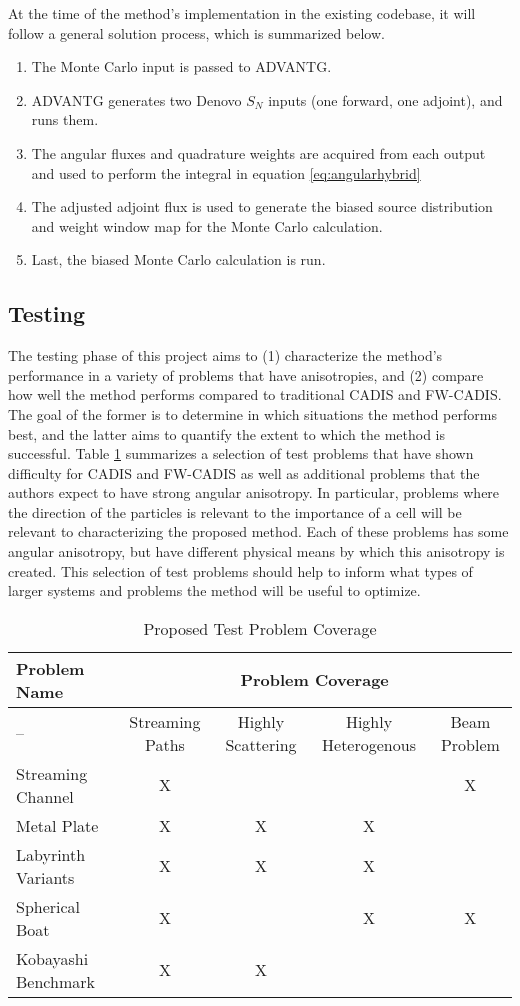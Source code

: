 \documentclass{mc2015}
\begin{document}
At the time of the method's implementation in the existing codebase, it will follow a general solution process, which is summarized below. 
\begin{enumerate}
\item The Monte Carlo input is passed to ADVANTG. 
\item ADVANTG generates two Denovo $S_N$ inputs (one forward, one adjoint), and runs them.
\item The angular fluxes and quadrature weights are acquired from each output and used to perform the integral in equation \ref{eq:angularhybrid}
\item The adjusted adjoint flux is used to generate the biased source distribution and weight window map for the Monte Carlo calculation.
\item Last, the biased Monte Carlo calculation is run. 
\end{enumerate}

\subsection{Testing}
\label{sec:Testing}

The testing phase of this project aims to (1) characterize the method's performance in a variety of problems that have anisotropies, and (2) compare how well the method performs compared to traditional CADIS and FW-CADIS.
The goal of the former is to determine in which situations the method performs best, and the latter aims to quantify the extent to which the method is successful. 
Table \ref{tab:testprobs} summarizes a selection of test problems that have shown difficulty for CADIS and FW-CADIS as well as additional problems that the authors expect to have strong angular anisotropy. 
In particular, problems where the direction of the particles is relevant to the importance of a cell will be relevant to characterizing the proposed method. Each of these problems has some angular anisotropy, but have different physical means by which this anisotropy is created. This selection of test problems should help to inform what types of larger systems and problems the method will be useful to optimize. 

 \begin{table}
  \centering
  \caption{Proposed Test Problem Coverage}
  \begin{tabular}{l|cccc}
    \toprule
    Problem Name & \multicolumn{4}{c}{Problem Coverage} \\
    \hline
    -- & Streaming Paths & Highly Scattering & Highly Heterogenous & Beam Problem \\
    \hline
    Streaming Channel   & X & & & X \\ 
    Metal Plate         & X & X & X &  \\
    Labyrinth Variants  & X & X & X &  \\ 
    Spherical Boat      & X & & X & X \\  
    Kobayashi Benchmark & X & X &  &  \\   
	\bottomrule
  \end{tabular}
  \label{tab:testprobs}
\end{table}
\end{document}
